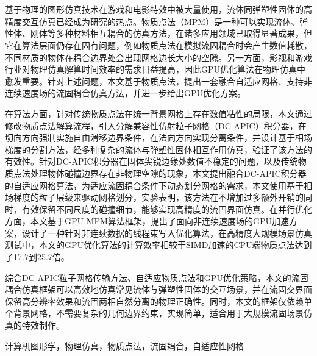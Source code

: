 \chapter*{}
基于物理的图形仿真技术在游戏和电影特效中被大量使用，流体同弹塑性固体的高精度交互仿真已经成为研究的热点。物质点法（MPM）是一种可以实现流体、弹性体、刚体等多种材料相互耦合的仿真方法，在诸多应用领域已取得显著成果，但它在算法层面仍存在固有问题，例如物质点法在模拟流固耦合时会产生数值耗散，不同材质的物体在耦合边界处会出现网格边长大小的空隙。另一方面，影视和游戏行业对物理仿真解算时间效率的需求日益提高，因此GPU优化算法在物理仿真中愈发重要。针对上述问题，本文基于物质点法，提出一套融合自适应网格、支持非连续速度场的流固耦合仿真方法，并进一步给出GPU优化方案。

在算法方面，针对传统物质点法在统一背景网格上存在数值粘性的局限，本文通过修改物质点法解算流程，引入分解兼容性仿射粒子网格（DC-APIC）积分器，在切向方向强制实施自由滑移边界条件，在法向方向实现分离条件，并设计基于相场梯度的分割方法，经多种复杂的流体与弹塑性固体相互作用仿真，验证了该方法的有效性。针对DC-APIC积分器在固体尖锐边缘处数值不稳定的问题，以及传统物质点法处理物体碰撞边界存在非物理空隙的现象，本文提出融合DC-APIC积分器的自适应网格算法，为适应流固耦合条件下动态划分网格的需求，本文使用基于相场梯度的粒子层级来驱动网格划分，实验表明，该方法在不增加过多额外开销的同时，有效保留不同尺度的碰撞细节，能够实现高精度的流固界面仿真。在并行优化方面，本文基于GPU-MPM算法框架，提出了面向非连续速度场的GPU加速方案，设计了一种针对非连续数据的线程束写入优化算法，在高精度大规模场景仿真测试中，本文的GPU优化算法的计算效率相较于SIMD加速的CPU端物质点法达到了17.7到25.7倍。

综合DC-APIC粒子网格传输方法、自适应物质点法和GPU优化策略，本文的流固耦合仿真框架可以高效地仿真常见流体与弹塑性固体的交互场景，并在流固交界面保留高分辨率效果和流固两相自然分离的物理正确性。同时，本文的框架仅依赖单个背景网格，不需要复杂的几何边界约束，实现简单，适合用于大规模流固场景仿真的特效制作。


{} 计算机图形学，物理仿真，物质点法，流固耦合，自适应性网格
